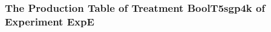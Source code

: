  \begin{frame}
 \fontsize{8pt}{9pt}\selectfont
 \frametitle{ The Production Table of Treatment BoolT5sgp4k of Experiment ExpE }

 \label{ExpEGrammarTable010.tex}  
 \end{frame}


